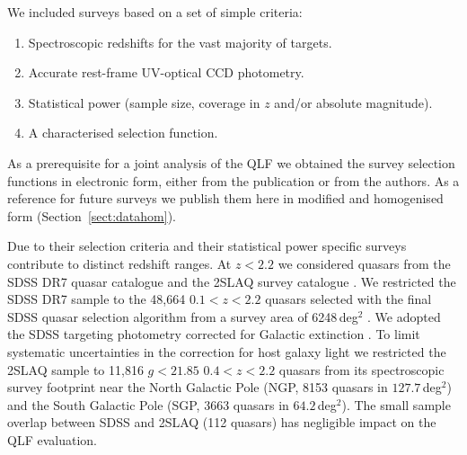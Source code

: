 \documentclass[fleqn,usenatbib]{mnras}
\begin{document}
We included surveys based on a set of simple criteria:
\begin{enumerate}
\item Spectroscopic redshifts for the vast majority of targets.
\item Accurate rest-frame UV-optical CCD photometry.
\item Statistical power (sample size, coverage in $z$ and/or absolute magnitude).
\item A characterised selection function.
\end{enumerate}
As a prerequisite for a joint analysis of the QLF we obtained the
survey selection functions in electronic form, either from the
publication or
from the authors. As a reference for future surveys we
publish them here
in modified and homogenised form
(Section~\ref{sect:datahom}).

Due to their selection criteria and their statistical power specific
surveys contribute to distinct redshift ranges. At $z<2.2$ we
considered quasars from the SDSS DR7 quasar catalogue
\citep{2010AJ....139.2360S} and the 2SLAQ survey catalogue
\citep{2009MNRAS.392...19C}. We restricted the SDSS DR7 sample to the
48,664 $0.1<z<2.2$ quasars selected with the final SDSS quasar
selection algorithm \citep{2002AJ....123.2945R, 2006AJ....131.2766R}
from a survey area of 6248\,deg$^2$ \citep{2012ApJ...746..169S}. We
adopted the SDSS targeting photometry corrected for Galactic
extinction \citep{2010AJ....139.2360S}. To limit systematic
uncertainties in the correction for host galaxy light
\citep{2009MNRAS.392...19C} we restricted the 2SLAQ sample to 11,816
$g<21.85$ $0.4<z<2.2$ quasars from its spectroscopic survey footprint
near the North Galactic Pole (NGP, 8153 quasars in $127.7$\,deg$^2$)
and the South Galactic Pole (SGP, 3663 quasars in
$64.2$\,deg$^2$). The small sample overlap between SDSS and 2SLAQ (112
quasars) has negligible impact on the QLF evaluation.
\end{document}
